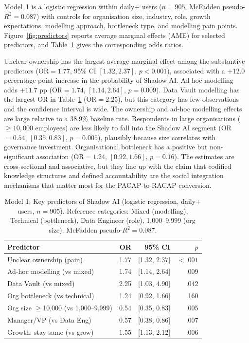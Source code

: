 \documentclass[twocolumn]{article}
\begin{document}
Model~1 is a logistic regression within daily+ users ($n{=}905$, McFadden pseudo-$R^{2}{=}0.087$) with controls for organisation size, industry, role, growth expectations, modelling approach, bottleneck type, and modelling pain points. Figure~\ref{fig:predictors} reports average marginal effects (AME) for selected predictors, and Table~\ref{tab:model1} gives the corresponding odds ratios.

Unclear ownership has the largest average marginal effect among the substantive predictors (OR${=}1.77$, 95\% CI $[1.32, 2.37]$, $p{<}0.001$), associated with a ${+}12.0$ percentage-point increase in the probability of Shadow AI. Ad-hoc modelling adds ${+}11.7$ pp (OR${=}1.74$, $[1.14, 2.64]$, $p{=}0.009$). Data Vault modelling has the largest OR in Table~\ref{tab:model1} (OR${=}2.25$), but this category has few observations and the confidence interval is wide. The ownership and ad-hoc modelling effects are large relative to a 38.9\% baseline rate. Respondents in large organisations (${\geq}10{,}000$ employees) are less likely to fall into the Shadow AI segment (OR${=}0.54$, $[0.35, 0.83]$, $p{=}0.005$), plausibly because size correlates with governance investment. Organisational bottleneck has a positive but non-significant association (OR${=}1.24$, $[0.92, 1.66]$, $p{=}0.16$). The estimates are cross-sectional and associative, but they line up with the claim that codified knowledge structures and defined accountability are the social integration mechanisms that matter most for the PACAP-to-RACAP conversion.

\begin{table}[t]
\centering
\small
\caption{Model 1: Key predictors of Shadow AI (logistic regression, daily+ users, $n{=}905$). Reference categories: Mixed (modelling), Technical (bottleneck), Data Engineer (role), 1,000--9,999 (org size). McFadden pseudo-$R^{2}{=}0.087$.}
\label{tab:model1}
\begin{tabular}{@{}lrrr@{}}
\toprule
Predictor & OR & 95\% CI & $p$ \\
\midrule
Unclear ownership (pain) & 1.77 & [1.32, 2.37] & ${<}.001$ \\
Ad-hoc modelling (vs mixed) & 1.74 & [1.14, 2.64] & .009 \\
Data Vault (vs mixed) & 2.25 & [1.03, 4.90] & .042 \\
Org bottleneck (vs technical) & 1.24 & [0.92, 1.66] & .160 \\
Org size $\geq$10,000 (vs 1,000--9,999) & 0.54 & [0.35, 0.83] & .005 \\
Manager/VP (vs Data Eng) & 0.57 & [0.38, 0.86] & .007 \\
Growth: stay same (vs grow) & 1.55 & [1.13, 2.12] & .006 \\
\bottomrule
\end{tabular}
\end{table}
\end{document}
